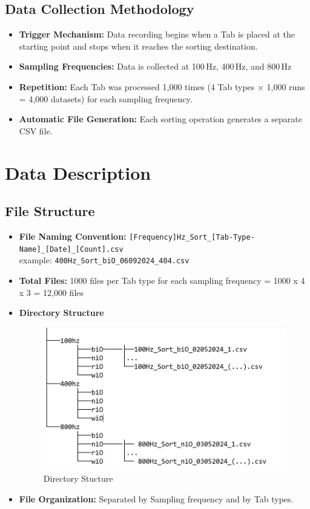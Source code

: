 \documentclass{article}
\begin{document}
\subsection{Data Collection Methodology}

\begin{itemize}
  \item \textbf{Trigger Mechanism:} Data recording begins when a Tab is placed at the starting point and stops when it reaches the sorting destination.
  \item \textbf{Sampling Frequencies:} Data is collected at 100\,Hz, 400\,Hz, and 800\,Hz
  \item \textbf{Repetition:} Each Tab was processed 1,000 times (4 Tab types × 1,000 runs = 4,000 datasets) for each sampling frequency.
  \item \textbf{Automatic File Generation:} Each sorting operation generates a separate CSV file.
\end{itemize}

\section{Data Description}

\subsection{File Structure}

\begin{itemize}
 

  \item \textbf{File Naming Convention:} \texttt{[Frequency]Hz\_Sort\_[Tab-Type-Name]\_[Date]\_[Count].csv} 
  \\
  example: \texttt{400Hz\_Sort\_biO\_06092024\_404.csv}
\item \textbf{Total Files:} 1000 files per Tab type for each sampling frequency = 1000 x 4 x 3 = 12,000 files
\item \textbf{Directory Structure}
\begin{figure}[h]
    \centering
    \includegraphics[width=0.5\linewidth]{file_structure.png}
    \caption{Directory Stucture}
    \label{fig:enter-label}
\end{figure}




  \item \textbf{File Organization:} Separated by Sampling frequency and by Tab types.
\end{itemize}
\end{document}
